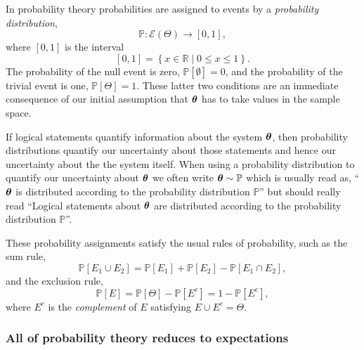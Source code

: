 \documentclass[11pt, oneside]{article}
\newcommand{\PP}{ \mathbb{P} }
\newcommand{\RR}{ \mathbb{R} }
\newcommand{\bt}{ \mbox{\boldmath{$\theta$}} }
\begin{document}
In probability theory probabilities are assigned to events by a \emph{probability 
distribution},
%
\begin{equation*}
\PP : \mathcal{E} \! \left( \Theta \right) \rightarrow \left[0, 1 \right],
\end{equation*}
%
where $\left[0, 1\right]$ is the interval
%
\begin{equation*}
\left[ 0, 1 \right] = \left\{ x \in \RR \mid 0 \le x \le 1 \right\}.
\end{equation*}
%
The probability of the null event is zero, 
$\PP \! \left[ \emptyset \right] = 0$, and the probability of the trivial
event is one, $\PP \! \left[ \Theta \right] = 1$.  These latter
two conditions are an immediate consequence of our initial
assumption that $\bt$ has to take values in the sample space.

If logical statements quantify information about the system $\bt$, 
then probability distributions quantify our uncertainty about those 
statements and hence our uncertainty about the the system itself.  
When using a probability distribution to 
quantify our uncertainty about $\bt$ we often write $\bt \sim \PP$ which 
is usually read as, ``$\bt$ is distributed according to the probability 
distribution $\PP$'' but should really read ``Logical statements about 
$\bt$ are distributed according to the probability distribution $\PP$''.

These probability assignments satisfy the usual rules of probability, 
such as the sum rule,
%
\begin{equation*}
\PP \! \left[ E_{1} \cup E_{2} \right]
= 
\PP \! \left[ E_{1} \right] + \PP \! \left[ E_{2} \right] 
- \PP \! \left[ E_{1} \cap E_{2} \right],
\end{equation*}
%
and the exclusion rule,
%
\begin{equation*}
\PP \! \left[ E \right] 
= 
\PP \! \left[ \Theta \right] - \PP \! \left[ E^{c} \right]
=
1 - \PP \! \left[ E^{c} \right],
\end{equation*}
%
where $E^{c}$ is the \emph{complement} of $E$ satisfying
$E \cup E^{c} = \Theta$. \\


\subsubsection*{All of probability theory reduces to expectations}
\end{document}
